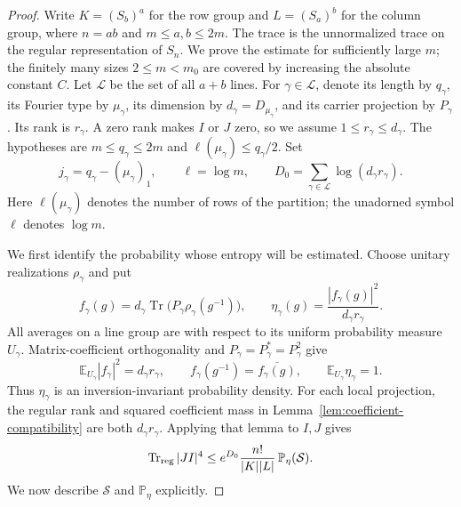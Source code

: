 \begin{proof}
Write $K=(S_b)^a$ for the row group and $L=(S_a)^b$ for the
column group, where $n=ab$ and $m\le a,b\le2m$. The trace is the
unnormalized trace on the regular representation of $S_n$. We prove
the estimate for sufficiently large $m$; the finitely many sizes
$2\le m<m_0$ are covered by increasing the absolute constant $C$.
Let $\mathcal L$ be the set of all $a+b$ lines. For
$\gamma\in\mathcal L$, denote its length by $q_\gamma$, its
Fourier type by $\mu_\gamma$, its dimension by
$d_\gamma=D_{\mu_\gamma}$, and its carrier projection by
$P_\gamma$. Its rank is $r_\gamma$. A zero rank makes $I$ or $J$
zero, so we assume $1\le r_\gamma\le d_\gamma$. The hypotheses
are $m\le q_\gamma\le2m$ and
$\ell(\mu_\gamma)\le q_\gamma/2$. Set
\[
 j_\gamma=q_\gamma-(\mu_\gamma)_1,
 \qquad \ell=\log m,
 \qquad D_0=\sum_{\gamma\in\mathcal L}
                         \log(d_\gamma r_\gamma).
\]
Here $\ell(\mu_\gamma)$ denotes the number of rows of the partition;
the unadorned symbol $\ell$ denotes $\log m$.

We first identify the probability whose entropy will be estimated.
Choose unitary realizations $\rho_\gamma$ and put
\[
 f_\gamma(g)=d_\gamma
       \operatorname{Tr}\bigl(P_\gamma\rho_\gamma(g^{-1})\bigr),
 \qquad
 \eta_\gamma(g)=\frac{|f_\gamma(g)|^2}
                            {d_\gamma r_\gamma}.
\]
All averages on a line group are with respect to its uniform
probability measure $U_\gamma$. Matrix-coefficient orthogonality
and $P_\gamma=P_\gamma^*=P_\gamma^2$ give
\begin{equation}\label{rec:smoothed-line-normalization}
 \mathbb E_{U_\gamma}|f_\gamma|^2=d_\gamma r_\gamma,
 \qquad
 f_\gamma(g^{-1})=\overline{f_\gamma(g)},
 \qquad \mathbb E_{U_\gamma}\eta_\gamma=1.
\end{equation}
Thus $\eta_\gamma$ is an inversion-invariant probability density.
For each local projection, the regular rank and squared coefficient
mass in Lemma~\ref{lem:coefficient-compatibility} are both
$d_\gamma r_\gamma$. Applying that lemma to $I,J$ gives
\begin{equation}\label{rec:smoothed-trace-probability}
 \operatorname{Tr}_{\rm reg}|JI|^4
 \le e^{D_0}\frac{n!}{|K||L|}\,\mathbb P_\eta(\mathcal S).
\end{equation}
We now describe $\mathcal S$ and $\mathbb P_\eta$ explicitly.


\end{proof}
